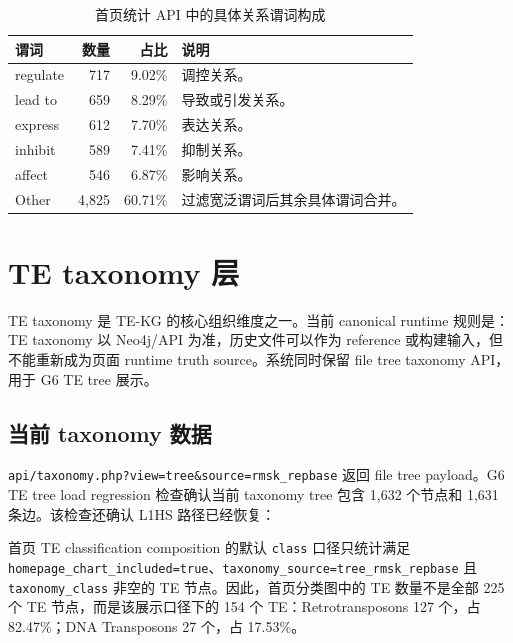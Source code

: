 \documentclass[12pt,a4paper,UTF8]{ctexart}
\newcommand{\code}[1]{\texttt{#1}}
\begin{document}
\begin{table}[H]
  \centering
  \caption{首页统计 API 中的具体关系谓词构成}
  \begin{tabularx}{0.9\textwidth}{l r r Y}
    \toprule
    谓词 & 数量 & 占比 & 说明 \\
    \midrule
    regulate & 717 & 9.02\% & 调控关系。 \\
    lead to & 659 & 8.29\% & 导致或引发关系。 \\
    express & 612 & 7.70\% & 表达关系。 \\
    inhibit & 589 & 7.41\% & 抑制关系。 \\
    affect & 546 & 6.87\% & 影响关系。 \\
    Other & 4,825 & 60.71\% & 过滤宽泛谓词后其余具体谓词合并。 \\
    \bottomrule
  \end{tabularx}
\end{table}

\section{TE taxonomy 层}

TE taxonomy 是 TE-KG 的核心组织维度之一。当前 canonical runtime 规则是：TE taxonomy 以 Neo4j/API 为准，历史文件可以作为 reference 或构建输入，但不能重新成为页面 runtime truth source。系统同时保留 file tree taxonomy API，用于 G6 TE tree 展示。

\subsection{当前 taxonomy 数据}

\code{api/taxonomy.php?view=tree\&source=rmsk\_repbase} 返回 file tree payload。G6 TE tree load regression 检查确认当前 taxonomy tree 包含 1,632 个节点和 1,631 条边。该检查还确认 L1HS 路径已经恢复：


首页 TE classification composition 的默认 \code{class} 口径只统计满足 \code{homepage\_chart\_included=true}、\code{taxonomy\_source=tree\_rmsk\_repbase} 且 \code{taxonomy\_class} 非空的 TE 节点。因此，首页分类图中的 TE 数量不是全部 225 个 TE 节点，而是该展示口径下的 154 个 TE：Retrotransposons 127 个，占 82.47\%；DNA Transposons 27 个，占 17.53\%。
\end{document}
